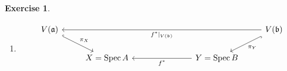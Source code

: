 \documentclass{article}
\theoremstyle{breakstyle}
\newtheorem{exercise}{Exercise}
\DeclareMathOperator{\spec}{Spec}
\begin{document}
\begin{exercise}
\begin{enumerate}[label=({\roman*})]
$$\begin{tikzcd}
                                  &                                                                     & S^{-1}A \arrow[ld, no head, dotted]                    & S^{-1}B \arrow[rd, no head, dotted]     &                                                                                              &                                                                      \\
                                  & \spec{S^{-1}A} \arrow[uuu, hook] \arrow[luuuu, no head, Leftrightarrow] &                                                        &                                         & \spec{S^{-1}B} \arrow[lll, "S^{-1}f^*"] \arrow[ruuuu, no head, Leftrightarrow] \arrow[uuu, hook] &                                                                     
\end{tikzcd}
            $$
            Both can be obtained by definition. \emph{(I suppose?)}
        \item 
            $$
\begin{tikzcd}
V(\mathfrak{a}) \arrow[rd, "\pi_X", hook] &                                                                              &                                                                   &                                              &                                                                                                       & V(\mathfrak{b}) \arrow[ld, "\pi_Y", hook] \arrow[lllll, "f^*\mid_{V(\mathfrak{b})}"] \\
                                          & X=\spec{A}                                                                   &                                                                   &                                              & Y=\spec{B} \arrow[lll, "f^*"]                                                                         &                                                                                      \\

\end{tikzcd}$$
\end{enumerate}
\end{exercise}
\end{document}
